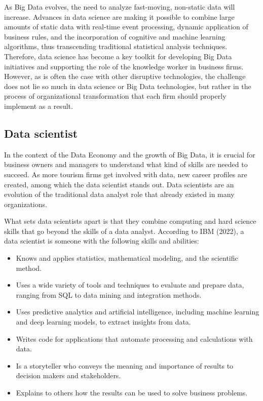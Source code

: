 \documentclass[
  letterpaper,
  DIV=11,
  numbers=noendperiod]{scrreprt}
\providecommand{\tightlist}{%
  \setlength{\itemsep}{0pt}\setlength{\parskip}{0pt}}\usepackage{longtable,booktabs,array}
\begin{document}
As Big Data evolves, the need to analyze fast-moving, non-static data
will increase. Advances in data science are making it possible to
combine large amounts of static data with real-time event processing,
dynamic application of business rules, and the incorporation of
cognitive and machine learning algorithms, thus transcending traditional
statistical analysis techniques. Therefore, data science has become a
key toolkit for developing Big Data initiatives and supporting the role
of the knowledge worker in business firms. However, as is often the case
with other disruptive technologies, the challenge does not lie so much
in data science or Big Data technologies, but rather in the process of
organizational transformation that each firm should properly implement
as a result.

\hypertarget{data-scientist}{%
\subsection{Data scientist}\label{data-scientist}}

In the context of the Data Economy and the growth of Big Data, it is
crucial for business owners and managers to understand what kind of
skills are needed to succeed. As more tourism firms get involved with
data, new career profiles are created, among which the data scientist
stands out. Data scientists are an evolution of the traditional data
analyst role that already existed in many organizations.

What sets data scientists apart is that they combine computing and hard
science skills that go beyond the skills of a data analyst. According to
IBM (2022), a data scientist is someone with the following skills and
abilities:

\begin{itemize}
\tightlist
\item
  Knows and applies statistics, mathematical modeling, and the
  scientific method.
\item
  Uses a wide variety of tools and techniques to evaluate and prepare
  data, ranging from SQL to data mining and integration methods.
\item
  Uses predictive analytics and artificial intelligence, including
  machine learning and deep learning models, to extract insights from
  data.
\item
  Writes code for applications that automate processing and calculations
  with data.
\item
  Is a storyteller who conveys the meaning and importance of results to
  decision makers and stakeholders.
\item
  Explains to others how the results can be used to solve business
  problems.
\end{itemize}
\end{document}
